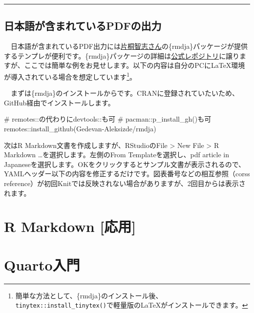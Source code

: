 \documentclass[
  a4paper,
  pandoc,
  ja=standard,
  jafont=haranoaji]{bxjsbook}
\newenvironment{Shaded}{\begin{snugshade}}{\end{snugshade}}
\newcommand{\CommentTok}[1]{\textcolor[rgb]{0.37,0.37,0.37}{#1}}
\newcommand{\FunctionTok}[1]{\textcolor[rgb]{0.28,0.35,0.67}{#1}}
\newcommand{\NormalTok}[1]{\textcolor[rgb]{0.00,0.48,0.65}{#1}}
\newcommand{\SpecialCharTok}[1]{\textcolor[rgb]{0.37,0.37,0.37}{#1}}
\newcommand{\StringTok}[1]{\textcolor[rgb]{0.13,0.47,0.30}{#1}}
\begin{document}
\begin{center}\rule{0.5\linewidth}{0.5pt}\end{center}

\hypertarget{sec-rmarkdown_japanese}{%
\section{日本語が含まれているPDFの出力}\label{sec-rmarkdown_japanese}}

　日本語が含まれているPDF出力には\href{https://ill-identified.hatenablog.com/}{片桐智志さん}の\{rmdja\}パッケージが提供するテンプレが便利です。\{rmdja\}パッケージの詳細は\href{https://github.com/Gedevan-Aleksizde/rmdja}{公式レポジトリ}に譲りますが、ここでは簡単な例をお見せします。以下の内容は自分のPCにLaTeX環境が導入されている場合を想定しています\footnote{簡単な方法として、\{rmdja\}のインストール後、\texttt{tinytex::install\_tinytex()}で軽量版のLaTeXがインストールできます。}。

　まずは\{rmdja\}のインストールからです。CRANに登録されていたいため、GitHub経由でインストールします。

\begin{Shaded}
\begin{Highlighting}[]
\CommentTok{\# remotes::の代わりにdevtools::も可}
\CommentTok{\# pacman::p\_install\_gh()も可}
\NormalTok{remotes}\SpecialCharTok{::}\FunctionTok{install\_github}\NormalTok{(}\StringTok{\textquotesingle{}Gedevan{-}Aleksizde/rmdja\textquotesingle{}}\NormalTok{)}
\end{Highlighting}
\end{Shaded}

次はR Markdown文書を作成しますが、RStudioのFile \textgreater{} New File
\textgreater{} R Markdown \ldots を選択します。左側のFrom
Templateを選択し、pdf article in
Japaneseを選択します。OKをクリックするとサンプル文書が表示されるので、YAMLヘッダー以下の内容を修正するだけです。図表番号などの相互参照（corss
reference）が初回Knitでは反映されない場合がありますが、2回目からは表示されます。

\hypertarget{sec-rmarkdown2}{%
\chapter{R Markdown {[}応用{]}}\label{sec-rmarkdown2}}

\hypertarget{sec-quarto}{%
\chapter{Quarto入門}\label{sec-quarto}}
\end{document}
